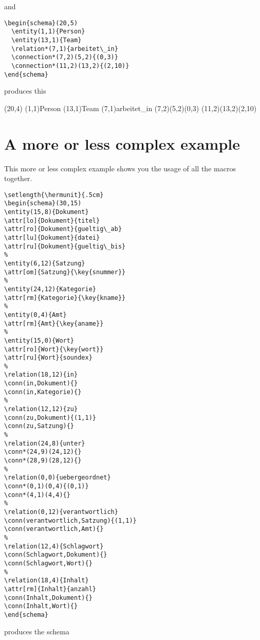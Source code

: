 \documentclass[a4paper,11pt]{article}
\begin{document}
and 

\begin{verbatim}
\begin{schema}(20,5)
  \entity(1,1){Person}
  \entity(13,1){Team}
  \relation*(7,1){arbeitet\_in}
  \connection*(7,2)(5,2){(0,3)}
  \connection*(11,2)(13,2){(2,10)}
\end{schema}
\end{verbatim}

produces this

\begin{schema}(20,4)
  \entity(1,1){Person}
  \entity(13,1){Team}
  \relation*(7,1){arbeitet\_in}
  \connection*(7,2)(5,2){(0,3)}
  \connection*(11,2)(13,2){(2,10)}
\end{schema}

\section{A more or less complex example}

This more or less complex example shows you the usage of all the macros together.

\begin{verbatim}
\setlength{\hermunit}{.5cm}
\begin{schema}(30,15)
\entity(15,8){Dokument}
\attr[lo]{Dokument}{titel}
\attr[ro]{Dokument}{gueltig\_ab}
\attr[lu]{Dokument}{datei}
\attr[ru]{Dokument}{gueltig\_bis}
%
\entity(6,12){Satzung}
\attr[om]{Satzung}{\key{snummer}}
%
\entity(24,12){Kategorie}
\attr[rm]{Kategorie}{\key{kname}}
%
\entity(0,4){Amt}
\attr[rm]{Amt}{\key{aname}}
%
\entity(15,0){Wort}
\attr[ro]{Wort}{\key{wort}}
\attr[ru]{Wort}{soundex}
%
\relation(18,12){in}
\conn(in,Dokument){}
\conn(in,Kategorie){}
%
\relation(12,12){zu}
\conn(zu,Dokument){(1,1)}
\conn(zu,Satzung){}
%
\relation(24,8){unter}
\conn*(24,9)(24,12){}
\conn*(28,9)(28,12){}
%
\relation(0,0){uebergeordnet}
\conn*(0,1)(0,4){(0,1)}
\conn*(4,1)(4,4){}
%
\relation(0,12){verantwortlich}
\conn(verantwortlich,Satzung){(1,1)}
\conn(verantwortlich,Amt){}
%
\relation(12,4){Schlagwort}
\conn(Schlagwort,Dokument){}
\conn(Schlagwort,Wort){}
%
\relation(18,4){Inhalt}
\attr[rm]{Inhalt}{anzahl}
\conn(Inhalt,Dokument){}
\conn(Inhalt,Wort){}
\end{schema}
\end{verbatim}

produces the schema
\end{document}

